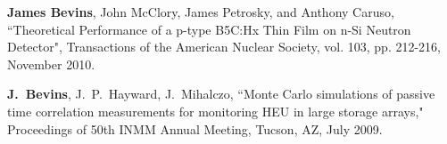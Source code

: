 \begin{bibsection}
\item \textbf{James Bevins}, John McClory, James Petrosky, and Anthony Caruso, ``Theoretical Performance of a p-type B5C:Hx Thin Film on n-Si Neutron Detector", Transactions of the American Nuclear Society, vol. 103, pp. 212-216, November 2010. 
  
  
\item \textbf{J.\ Bevins}, J.\ P.\ Hayward, J.\ Mihalczo, ``Monte Carlo simulations of passive time correlation measurements for monitoring HEU in large storage arrays," Proceedings of 50th INMM Annual Meeting, Tucson, AZ, July 2009.
\end{bibsection}

